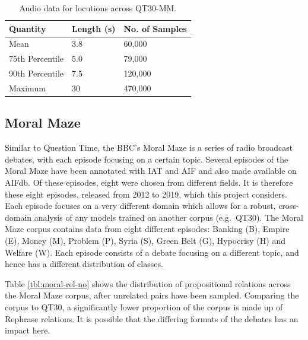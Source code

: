 \documentclass[twocolumn]{article}
\begin{document}
\begin{table}[h]
\centering
\caption{Audio data for locutions across QT30-MM.\label{tbl:audio-data-qt}}
\begin{tabular}{|l|ll|}
\hline
Quantity        & Length (s) & No. of Samples \\ \hline
Mean            & 3.8        & 60,000         \\
75th Percentile & 5.0        & 79,000         \\
90th Percentile & 7.5        & 120,000        \\
Maximum         & 30         & 470,000        \\ \hline
\end{tabular}
\end{table}

\subsection{Moral Maze}\label{moral-maze}

Similar to Question Time, the BBC's Moral Maze is a series of radio
broadcast debates, with each episode focusing on a certain topic.
Several episodes of the Moral Maze have been annotated with IAT and AIF
and also made available on AIFdb. Of these episodes, eight were chosen
from different fields. It is therefore these eight episodes, released
from 2012 to 2019, which this project considers. Each episode focuses on
a very different domain which allows for a robust, cross-domain analysis
of any models trained on another corpus (e.g.~QT30). The Moral Maze
corpus contains data from eight different episodes: Banking (B), Empire
(E), Money (M), Problem (P), Syria (S), Green Belt (G), Hypocrisy (H)
and Welfare (W). Each episode consists of a debate focusing on a
different topic, and hence has a different distribution of classes.

Table \ref{tbl:moral-rel-no} shows the distribution of propositional
relations across the Moral Maze corpus, after unrelated pairs have been
sampled. Comparing the corpus to QT30, a significantly lower proportion
of the corpus is made up of Rephrase relations. It is possible that the
differing formats of the debates has an impact here.
\end{document}
